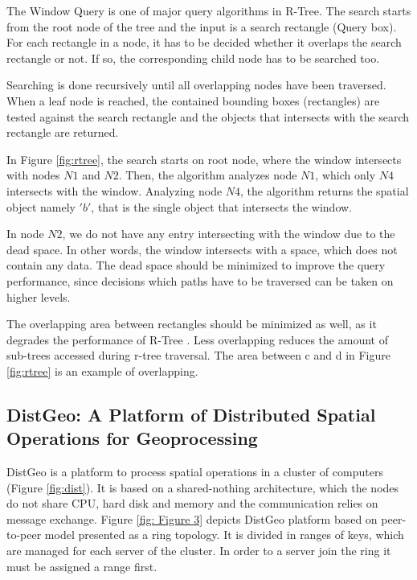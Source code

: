 The Window Query is one of major query algorithms in R-Tree.
The search starts from the root node of the tree and the input is a search rectangle (Query box). 
For each rectangle in a node, it has to be decided whether it overlaps the search rectangle or not. If so, the corresponding child node has to be searched too. 

Searching is done recursively until all overlapping nodes have been traversed. 
When a leaf node is reached, the contained bounding boxes (rectangles) are tested against the search rectangle 
and the objects that intersects with the search rectangle are returned.

In Figure \ref{fig:rtree}, the search starts on root node, where the window intersects with nodes $N1$ and $N2$. Then, the algorithm analyzes node $N1$, 
which only $N4$ intersects with the window. Analyzing node $N4$, the algorithm returns the spatial object namely $'b'$, that is the single object that intersects the window.

In node $N2$, we do not have any entry intersecting with the window due to the dead space. 
In other words, the window intersects with a space, which does not contain any data.
The dead space should be minimized to improve the query performance, since decisions which paths have to be traversed can be taken on higher levels. 

The overlapping area between rectangles should be minimized as well, as it degrades the performance of R-Tree \cite{beckmann1990r}. 
Less overlapping reduces the amount of sub-trees accessed during r-tree traversal. The area between c and d in Figure \ref{fig:rtree} is an example of overlapping.

\subsection{DistGeo: A Platform of Distributed Spatial Operations for Geoprocessing}
\label{sub:dist_geo}	

DistGeo is a platform to process spatial operations in a cluster of computers (Figure \ref{fig:dist}). 
It is based on a shared-nothing architecture, which the nodes do not share CPU, hard disk and memory and the communication relies on message exchange. 
Figure \ref{fig: Figure 3} depicts DistGeo platform based on peer-to-peer model presented as a ring topology. 
It is divided in ranges of keys, which are managed for each server of the cluster. In order to a server join the ring it must be assigned a range first.

